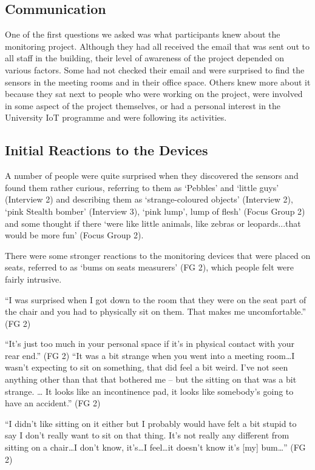 \subsection{Communication}
\label{sec:communication}

One of the first questions we asked was what participants knew about
the monitoring project. Although they had all received the email that
was sent out to all staff in the building, their level of awareness of
the project depended on various factors. Some had not checked their
email and were surprised to find the sensors in the meeting rooms and
in their office space. Others knew more about it because they sat next
to people who were working on the project, were involved in some
aspect of the project themselves, or had a personal interest in the
University IoT programme and were following its activities.

\subsection{Initial Reactions to the Devices}
\label{sec:init-react-devic}


A number of people were quite surprised when they discovered the
sensors and found them rather curious, referring to them as ‘Pebbles’
and ‘little guys’ (Interview 2) and describing them as
‘strange-coloured objects’ (Interview 2), ‘pink Stealth bomber’
(Interview 3), ‘pink lump’, lump of flesh’ (Focus Group 2) and some
thought if there ‘were like little animals, like zebras or
leopards...that would be more fun’ (Focus Group 2).

There were some stronger reactions to the monitoring devices that were
placed on seats, referred to as ‘bums on seats measurers’ (FG 2),
which people felt were fairly intrusive.

“I was surprised when I got down to the room that they were on the
seat part of the chair and you had to physically sit on them. That
makes me uncomfortable.” (FG 2)

“It’s just too much in your personal space if it’s in physical contact with your rear end.” (FG 2)
“It was a bit strange when you went into a meeting room…I wasn’t
expecting to sit on something, that did feel a bit weird. I’ve not
seen anything other than that that bothered me – but the sitting on
that was a bit strange. … It looks like an incontinence pad, it looks
like somebody’s going to have an accident.” (FG 2)

“I didn’t like sitting on it either but I probably would have felt a
bit stupid to say I don’t really want to sit on that thing. It’s not
really any different from sitting on a chair…I don’t know, it’s…I
feel…it doesn’t know it’s [my] bum…” (FG 2)

